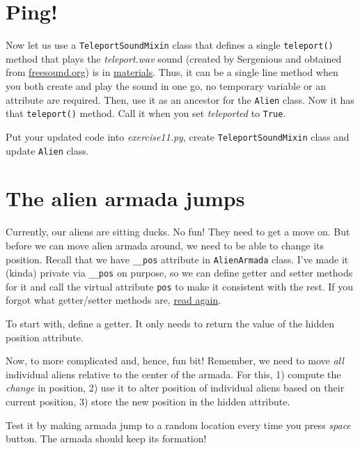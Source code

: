 \documentclass[
]{book}
\begin{document}
\hypertarget{ping}{%
\section{Ping!}\label{ping}}

Now let us use a \texttt{TeleportSoundMixin} class that defines a single \texttt{teleport()} method that plays the \emph{teleport.wav} sound (created by Sergenious and obtained from \href{https://freesound.org/people/Sergenious/sounds/55853/}{freesound.org}) is in \href{material/space-invaders.zip}{materials}. Thus, it can be a single line method when you both create and play the sound in one go, no temporary variable or an attribute are required. Then, use it as an ancestor for the \texttt{Alien} class. Now it has that \texttt{teleport()} method. Call it when you set \emph{teleported} to \texttt{True}.

Put your updated code into \emph{exercise11.py}, create \texttt{TeleportSoundMixin} class and update \texttt{Alien} class.

\hypertarget{the-alien-armada-jumps}{%
\section{The alien armada jumps}\label{the-alien-armada-jumps}}

Currently, our aliens are sitting ducks. No fun! They need to get a move on. But before we can move alien armada around, we need to be able to change its position. Recall that we have \texttt{\_\_pos} attribute in \texttt{AlienArmada} class. I've made it (kinda) private via \texttt{\_\_pos} on purpose, so we can define getter and setter methods for it and call the virtual attribute \texttt{pos} to make it consistent with the rest. If you forgot what getter/setter methods are, \protect\hyperlink{getter-setter}{read again}.

To start with, define a getter. It only needs to return the value of the hidden position attribute.

Now, to more complicated and, hence, fun bit! Remember, we need to move \emph{all} individual aliens relative to the center of the armada. For this, 1) compute the \emph{change} in position, 2) use it to alter position of individual aliens based on their current position, 3) store the new position in the hidden attribute.

Test it by making armada jump to a random location every time you press \emph{space} button. The armada should keep its formation!
\end{document}
